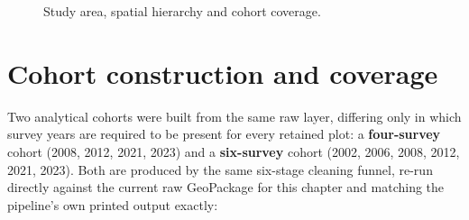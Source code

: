 \begin{figure}[!htbp]
\centering
{}
\caption{Study area, spatial hierarchy and cohort coverage.}
\label{fig:data-study-area}
\end{figure}

\section{Cohort construction and coverage}
\label{sec:data-cohorts}

Two analytical cohorts were built from the same raw layer, differing only in which survey years
are required to be present for every retained plot: a \textbf{four-survey} cohort (2008, 2012,
2021, 2023) and a \textbf{six-survey} cohort (2002, 2006, 2008, 2012, 2021, 2023). Both are
produced by the same six-stage cleaning funnel, re-run directly against the current raw GeoPackage
for this chapter and matching the pipeline's own printed output exactly:

